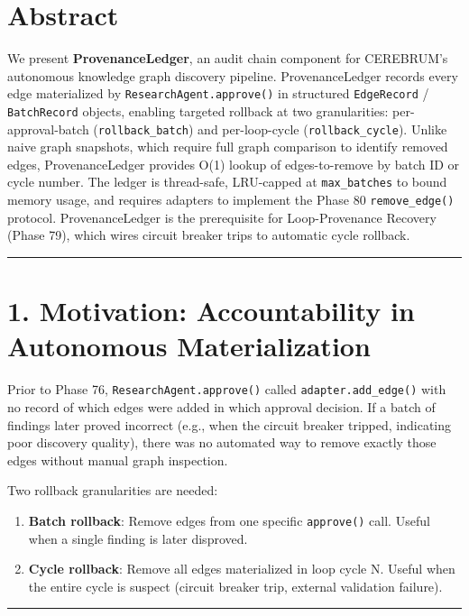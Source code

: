 
\section*{Abstract}

We present \textbf{ProvenanceLedger}, an audit chain component for CEREBRUM's autonomous knowledge graph discovery pipeline. ProvenanceLedger records every edge materialized by \texttt{ResearchAgent.approve()} in structured \texttt{EdgeRecord} / \texttt{BatchRecord} objects, enabling targeted rollback at two granularities: per-approval-batch (\texttt{rollback\_batch}) and per-loop-cycle (\texttt{rollback\_cycle}). Unlike naive graph snapshots, which require full graph comparison to identify removed edges, ProvenanceLedger provides O(1) lookup of edges-to-remove by batch ID or cycle number. The ledger is thread-safe, LRU-capped at \texttt{max\_batches} to bound memory usage, and requires adapters to implement the Phase 80 \texttt{remove\_edge()} protocol. ProvenanceLedger is the prerequisite for Loop-Provenance Recovery (Phase 79), which wires circuit breaker trips to automatic cycle rollback.

\medskip\noindent\rule{\linewidth}{0.4pt}\medskip

\section*{1. Motivation: Accountability in Autonomous Materialization}

Prior to Phase 76, \texttt{ResearchAgent.approve()} called \texttt{adapter.add\_edge()} with no record of which edges were added in which approval decision. If a batch of findings later proved incorrect (e.g., when the circuit breaker tripped, indicating poor discovery quality), there was no automated way to remove exactly those edges without manual graph inspection.

Two rollback granularities are needed:
\begin{enumerate}
  \item \textbf{Batch rollback}: Remove edges from one specific \texttt{approve()} call. Useful when a single finding is later disproved.
  \item \textbf{Cycle rollback}: Remove all edges materialized in loop cycle N. Useful when the entire cycle is suspect (circuit breaker trip, external validation failure).
\end{enumerate}


\medskip\noindent\rule{\linewidth}{0.4pt}\medskip

